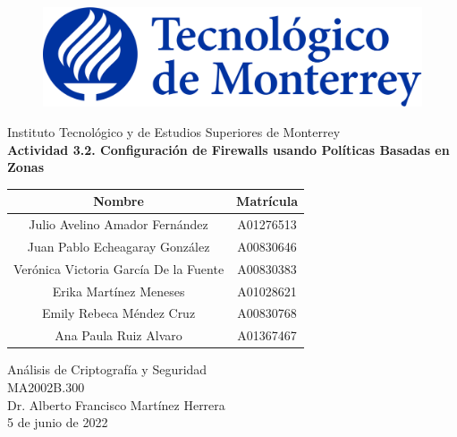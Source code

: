 \documentclass[11pt]{article}
\begin{document}
    \begin{titlepage}
        \begin{center}
            \begin{figure}
                \centering
                \includegraphics[scale=0.13]{../../img/logo_itesm.png}\\ %
            \end{figure}
        \vspace{5cm}
        \LARGE{Instituto Tecnológico y de Estudios Superiores de Monterrey}\\
        \fontsize{12}{14}\selectfont
        \vspace{1cm}
        \textbf{Actividad 3.2. Configuración de Firewalls usando Políticas Basadas en Zonas }\\ %
        \vspace{0.7cm}
        \begin{table}[!h]
            \centering
            \begin{tabular}{ ||c|c|| }
                \hline
                Nombre & Matrícula \\
                \hline
                Julio Avelino Amador Fernández & A01276513 \\
                \hline
                Juan Pablo Echeagaray González & A00830646 \\
                \hline
                Verónica Victoria García De la Fuente & A00830383 \\
                \hline
                Erika Martínez Meneses & A01028621 \\
                \hline
                Emily Rebeca Méndez Cruz & A00830768 \\
                \hline
                Ana Paula Ruiz Alvaro & A01367467 \\
                \hline
            \end{tabular}
        \end{table}
        \vspace{0.7cm}
        Análisis de Criptografía y Seguridad\\ %
        \vspace{0.2cm}
        MA2002B.300\\ %
        \vspace{0.2cm}
        Dr. Alberto Francisco Martínez Herrera \\ %
        \vspace{0.7cm}
        5 de junio de 2022\\ %
        \end{center}
    \end{titlepage}
\end{document}
